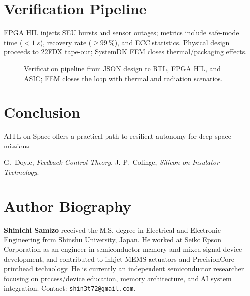 \documentclass[conference]{IEEEtran}
\begin{document}
\section{Verification Pipeline}
FPGA HIL injects SEU bursts and sensor outages; metrics include safe-mode time ($<\SI{1}{s}$), recovery rate ($\ge\! \SI{99}{\%}$), and ECC statistics. Physical design proceeds to 22FDX tape-out; SystemDK FEM closes thermal/packaging effects.

\begin{figure}[t]
  \centering
  \caption{Verification pipeline from JSON design to RTL, FPGA HIL, and ASIC; FEM closes the loop with thermal and radiation scenarios.}
  \label{fig:pipeline}
\end{figure}

\FloatBarrier

\section{Conclusion}
AITL on Space offers a practical path to resilient autonomy for deep-space missions.

\begin{thebibliography}{99}
 G.~Doyle, \textit{Feedback Control Theory}.
 J.-P.~Colinge, \textit{Silicon-on-Insulator Technology}.
\end{thebibliography}

\section*{Author Biography}
\noindent
\textbf{Shinichi Samizo} received the M.S. degree in Electrical and Electronic Engineering from Shinshu University, Japan. He worked at Seiko Epson Corporation as an engineer in semiconductor memory and mixed-signal device development, and contributed to inkjet MEMS actuators and PrecisionCore printhead technology. He is currently an independent semiconductor researcher focusing on process/device education, memory architecture, and AI system integration. Contact: \texttt{shin3t72@gmail.com}.
\end{document}
